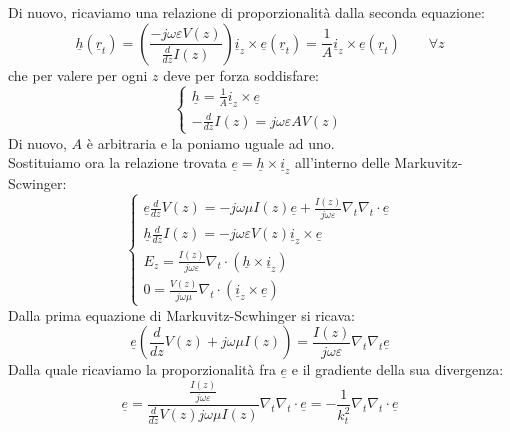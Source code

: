\documentclass{book}
\begin{document}
    Di nuovo, ricaviamo una relazione di proporzionalità dalla seconda equazione:
    \begin{equation}
        \underline{h}(\underline{r}_{t}) = (\frac{-j \omega \varepsilon V(z)}{\frac{d}{dz}I(z)}) \underline{i}_{z} \times \underline{e}(\underline{r}_{t})=\frac{1}{A}\underline{i}_{z} \times \underline{e}(\underline{r}_{t}) \qquad \forall z
    \end{equation}
    che per valere per ogni $z$ deve per forza soddisfare:
    \begin{equation}
        \begin{cases} 
        \displaystyle \underline{h} =\frac{1}{A} \underline{i}_{z} \times \underline{e} \\
        \displaystyle -\frac{d}{dz}I(z)=j \omega \varepsilon A V(z) 
        \end{cases}
    \end{equation}
    Di nuovo, $A$ è arbitraria e la poniamo uguale ad uno. \\
    Sostituiamo ora la relazione trovata $\underline{e} = \underline{h} \times \underline{i}_{z}$ all'interno delle 
    Markuvitz-Scwinger:
    \begin{equation}
        \begin{cases}
            \displaystyle \underline{e} \frac{d}{dz}V(z) = -j \omega \mu I(z) \underline{e} + \frac{I(z)}{j \omega \varepsilon} \nabla_{t}\nabla_{t} \cdot \underline{e} \\
            \displaystyle \underline{h}\frac{d}{dz}I(z) = -j \omega \varepsilon V(z) \underline{i}_{z} \times \underline{e} \\
            \displaystyle E_{z} = \frac{I(z)}{j \omega \varepsilon} \nabla_{t} \cdot (\underline{h} \times \underline{i}_{z}) \\
            \displaystyle 0 = \frac{V(z)}{j \omega \mu}\nabla_{t} \cdot (\underline{i}_{z} \times \underline{e})
        \end{cases}
    \end{equation} \newpage
    Dalla prima equazione di Markuvitz-Scwhinger si ricava:
    \begin{equation}
        \underline{e}(\frac{d}{dz}V(z)+j \omega \mu I(z)) = \frac{I(z)}{j \omega \varepsilon}\nabla_{t}\nabla_{t} \underline{e}
    \end{equation}
    Dalla quale ricaviamo la proporzionalità fra $\underline{e}$ e il gradiente della sua divergenza:
    \begin{equation}
        \underline{e} = \displaystyle \frac{\frac{I(z)}{j \omega \varepsilon}}{\frac{d}{dz}V(z)j \omega \mu I(z)} \nabla_{t} \nabla_{t} \cdot \underline{e} = - \frac{1}{k_{t} ^{2}}\nabla_{t} \nabla_{t} \cdot \underline{e}
    \end{equation}
\end{document}
